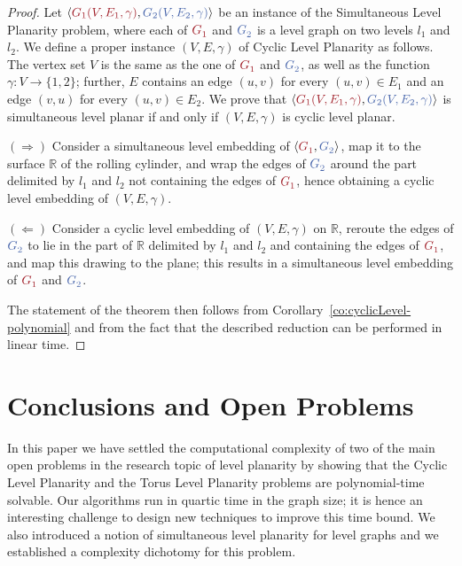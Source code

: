\documentclass{llncs}
\newcommand{\red}[1]{{\color{red}{#1\xspace}}}
\newcommand{\blue}[1]{{\color{blue}{#1\xspace}}}
\newcommand{\Gr}[1]{$\red{G^{#1}_1}$\xspace}
\newcommand{\Gb}[1]{$\blue{G^{#1}_2}$\xspace}
\newcommand{\sefeinstance}[1]{$\langle\red{G^{#1}_1},\blue{G^{#1}_2}\rangle$\xspace}
\begin{document}
\begin{proof}
Let $\langle \red{G_1(V,E_1,\gamma)},\blue{G_2(V,E_2,\gamma)} \rangle$ be an instance of the {\sc Simultaneous Level Planarity} problem, where each of \Gr{} and \Gb{} is a level graph on two levels $l_1$ and $l_2$. We define a proper instance $(V,E,\gamma)$ of {\sc Cyclic Level Planarity} as follows. The vertex set $V$ is the same as the one of \Gr{} and \Gb{}, as well as the function $\gamma:V\rightarrow\{1,2\}$; further, $E$ contains an edge $(u,v)$ for every $(u,v) \in E_1$ and an edge $(v,u)$ for every $(u,v) \in E_2$. We prove that $\langle \red{G_1(V,E_1,\gamma)},\blue{G_2(V,E_2,\gamma)} \rangle$ is simultaneous level planar if and only if $(V,E,\gamma)$ is cyclic level planar.

$(\Longrightarrow)$ Consider a simultaneous level embedding of \sefeinstance{}, map it to the surface $\mathbb R$ of the rolling cylinder, and wrap the edges of \Gb{} around the part delimited by $l_1$ and $l_2$ not containing the edges of \Gr{}, hence obtaining a cyclic level embedding of $(V,E,\gamma)$. 

$(\Longleftarrow)$ Consider a cyclic level embedding of $(V,E,\gamma)$ on $\mathbb R$, reroute the edges of \Gb{} to lie in the part of $\mathbb R$ delimited by $l_1$ and $l_2$ and containing the edges of \Gr{}, and map this drawing to the plane; this results in a simultaneous level embedding of \Gr{} and \Gb{}. 

The statement of the theorem then follows from Corollary~\ref{co:cyclicLevel-polynomial} and from the fact that the described reduction can be performed in linear time.
\end{proof}









\section{Conclusions and Open Problems} \label{se:conclusions}

In this paper we have settled the computational complexity of two of the main open problems in the research topic of level planarity by showing that the {\sc Cyclic Level Planarity} and the {\sc Torus Level Planarity} problems are polynomial-time solvable.
Our algorithms run in quartic time in the graph size; it is hence an interesting challenge to design new techniques to improve this time bound. 
We also introduced a notion of simultaneous level planarity for level graphs and we established a complexity dichotomy for this problem.
\end{document}
